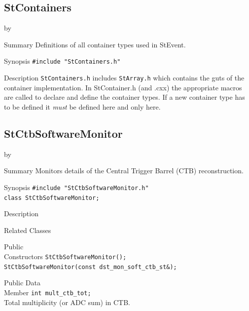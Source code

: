 \documentclass[twoside]{article}
\newcommand{\StEvent}{\textsf{StEvent}}
\newcommand{\entrylabel}[1]{\mbox{\textbf{{#1}}}\hfil}%
\newenvironment{entry}
{\begin{list}{}%
    {\renewcommand{\makelabel}{\entrylabel}%
     \setlength{\labelwidth}{90pt}%
     \setlength{\leftmargin}{\labelwidth}
     \advance\leftmargin by \labelsep%
      }%
    }%
  {\end{list}}
\newcommand{\Entrylabel}[1]%
{\raisebox{0pt}[1ex][0pt]{\makebox[\labelwidth][l]%
    {\parbox[t]{\labelwidth}{\hspace{0pt}\textbf{{#1}}}}}}
\newenvironment{Entry}%
{\renewcommand{\entrylabel}{\Entrylabel}\begin{entry}}%
  {\end{entry}}
\begin{document}
\subsection{StContainers}
\label{sec:StContainers}
\begin{Entry}
\item[Summary] Definitions of all container types used in \StEvent.
\item[Synopsis]
    \verb+#include "StContainers.h"+\\
\item[Description] \texttt{StContainers.h} includes \texttt{StArray.h}
    which contains the guts of the container implementation. In
    StContainer.h (and .cxx) the appropriate macros are called to
    declare and define the container types. If a new container type
    has to be defined it \emph{must} be defined here and only here.
\end{Entry}
\clearpage


\subsection{StCtbSoftwareMonitor}
\label{sec:StCtbSoftwareMonitor}
\begin{Entry}
\item[Summary] Monitors details of the Central Trigger Barrel (CTB)
    reconstruction.
\item[Synopsis]
    \verb+#include "StCtbSoftwareMonitor.h"+\\
    \verb+class StCtbSoftwareMonitor;+\\
\item[Description]
\item[Related Classes]
\item[Public\\ Constructors]
    \verb+StCtbSoftwareMonitor();+\\

    \verb+StCtbSoftwareMonitor(const dst_mon_soft_ctb_st&);+\\
\item[Public Data\\ Member]
    \verb+int mult_ctb_tot;+\\
    Total multiplicity (or ADC sum) in CTB.
\end{Entry}
\clearpage
\end{document}
